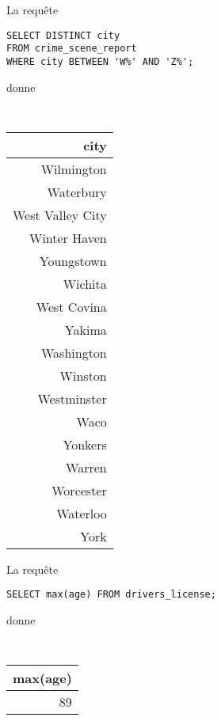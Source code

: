 \question{}
 
La requête
\begin{verbatim}
SELECT DISTINCT city 
FROM crime_scene_report 
WHERE city BETWEEN 'W%' AND 'Z%';
\end{verbatim}
donne
\begin{table}[!htp]
\centering
{\tt
\begin{tabular}{r}
city \\ \hline
Wilmington\\
Waterbury\\
West Valley City\\
Winter Haven\\
Youngstown\\
Wichita\\
West Covina\\
Yakima\\
Washington\\
Winston\\
Westminster\\
Waco\\
Yonkers\\
Warren\\
Worcester\\
Waterloo\\
York\\
\end{tabular}
}
\end{table}


\question{}
 
La requête
\begin{verbatim}
SELECT max(age) FROM drivers_license;
\end{verbatim}
donne
\begin{table}[!htp]
\centering
{\tt
\begin{tabular}{r}
max(age) \\ \hline
89
\end{tabular}
}
\end{table}



\question{}
 
